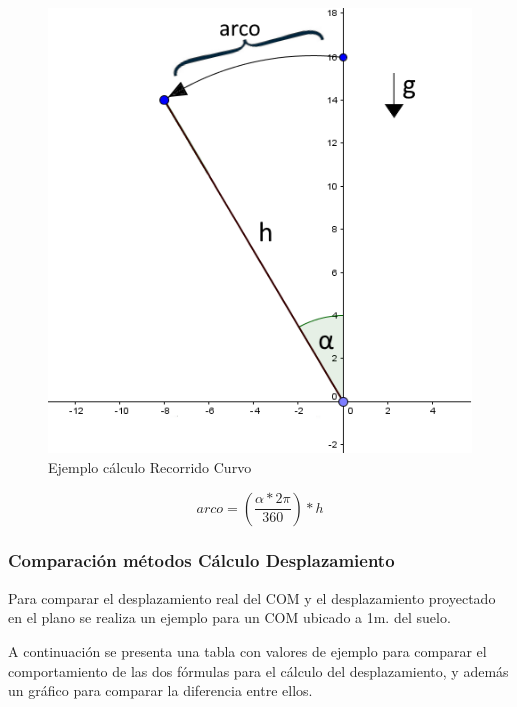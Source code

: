 \documentclass[12pt,a4paper]{article}
\begin{document}
\begin{figure}[H]
	\centering
	\includegraphics[scale=0.7]{images/calculoRecorridoCurvo}
	\caption{Ejemplo cálculo Recorrido Curvo}
	\label{fig:recorridocurvo}
\end{figure}

\begin{equation}
	\label{eq:recorridocurvo}
	arco=\left(\frac{\alpha*2\pi}{360}\right)*h
\end{equation}

\newpage
\subsubsection{Comparación métodos Cálculo Desplazamiento}
Para comparar el desplazamiento real del COM y el desplazamiento proyectado en el plano se realiza un ejemplo para un COM ubicado a 1m. del suelo.

A continuación se presenta una tabla con valores de ejemplo para comparar el comportamiento de las dos fórmulas para el cálculo del desplazamiento, y además un gráfico para comparar la diferencia entre ellos.
\end{document}
